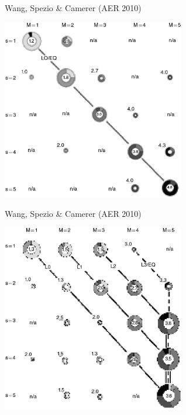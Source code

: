 \documentclass{beamer}
\begin{document}
\begin{frame}{Wang, Spezio \& Camerer (AER 2010)}
\begin{card}
    \begin{center}
    \includegraphics[width=0.6\textwidth]{./i/wsc2010Fig1.eps}
    \end{center}
\end{card}
\end{frame}

\begin{frame}{Wang, Spezio \& Camerer (AER 2010)}
\begin{card}
    \begin{center}
    \includegraphics[width=0.6\textwidth]{./i/wsc2010Fig2.eps}
    \end{center}
\end{card}
\end{frame}
\end{document}

